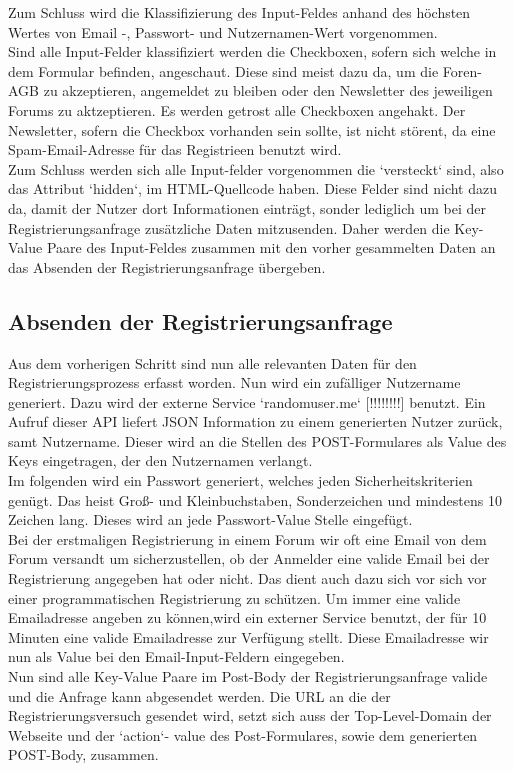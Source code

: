 Zum Schluss wird die Klassifizierung des Input-Feldes anhand des höchsten Wertes von Email -, Passwort- und Nutzernamen-Wert vorgenommen. \\
Sind alle Input-Felder klassifiziert werden die Checkboxen, sofern sich welche in dem Formular befinden, angeschaut. Diese sind meist dazu da, um die Foren-AGB zu akzeptieren, angemeldet zu bleiben oder den Newsletter des jeweiligen Forums zu aktzeptieren.
Es werden getrost alle Checkboxen angehakt. Der Newsletter, sofern die Checkbox vorhanden sein sollte, ist nicht störent, da eine Spam-Email-Adresse für das Registrieen benutzt wird.\\
Zum Schluss werden sich alle Input-felder vorgenommen die `versteckt` sind, also das Attribut `hidden`, im HTML-Quellcode haben.
Diese Felder sind nicht dazu da, damit der Nutzer dort Informationen einträgt, sonder lediglich um bei der Registrierungsanfrage zusätzliche Daten mitzusenden. Daher werden die Key-Value Paare des Input-Feldes zusammen mit den vorher gesammelten Daten an das Absenden der Registrierungsanfrage übergeben.
\subsection{Absenden der Registrierungsanfrage}
Aus dem vorherigen Schritt sind nun alle relevanten Daten für den Registrierungsprozess erfasst worden. Nun wird ein zufälliger Nutzername generiert. Dazu wird der externe Service `randomuser.me` [!!!!!!!!] benutzt. Ein Aufruf dieser API liefert JSON Information zu einem generierten Nutzer zurück, samt Nutzername. Dieser wird an die Stellen des POST-Formulares als Value des Keys eingetragen, der den Nutzernamen verlangt.\\
Im folgenden wird ein Passwort generiert, welches jeden Sicherheitskriterien genügt. Das heist Groß- und Kleinbuchstaben, Sonderzeichen und mindestens 10 Zeichen lang. Dieses wird an jede Passwort-Value Stelle eingefügt.\\
Bei der erstmaligen Registrierung in einem Forum wir oft eine Email von dem Forum versandt um sicherzustellen, ob der Anmelder eine valide Email bei der Registrierung angegeben hat oder nicht. Das dient auch dazu sich vor sich vor einer programmatischen Registrierung zu schützen. Um immer eine valide Emailadresse angeben zu können,wird ein externer Service benutzt, der für 10 Minuten eine valide Emailadresse zur Verfügung stellt. Diese Emailadresse  wir nun als Value bei den Email-Input-Feldern eingegeben.\\
Nun sind alle Key-Value Paare im Post-Body der Registrierungsanfrage valide und die Anfrage kann abgesendet werden.
Die URL an die der Registrierungsversuch gesendet wird, setzt sich auss der Top-Level-Domain der Webseite und der `action`- value des Post-Formulares, sowie dem generierten POST-Body, zusammen.
